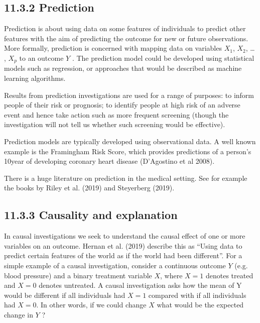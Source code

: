 \documentclass[letterpaper,10pt,english]{jupyterBook}
\begin{document}
\subsection{11.3.2 Prediction}
\label{\detokenize{11.d. Types of Investigation:prediction}}
\sphinxAtStartPar
Prediction is about using data on some features of individuals to predict other features with the aim of predicting the outcome for new or future observations. More formally, prediction is concerned with mapping data on variables \(X_{1}\), \(X_{2}\), … , \(X_{p}\) to an outcome \(Y\) . The prediction model could be developed using statistical models such as regression, or approaches that would be described as machine learning algorithms.

\sphinxAtStartPar
Results from prediction investigations are used for a range of purposes: to inform people of their risk or prognosis; to identify people at high risk of an adverse event and hence take action such as more frequent screening (though the investigation will not tell us whether such screening would be effective).

\sphinxAtStartPar
Prediction models are typically developed using observational data. A well known example is the Framingham Risk Score, which provides predictions of a person’s 10\sphinxhyphen{}year of developing coronary heart disease (D’Agostino et al 2008).

\sphinxAtStartPar
There is a huge literature on prediction in the medical setting. See for example the books by Riley et al. (2019) and Steyerberg (2019).


\subsection{11.3.3 Causality and explanation}
\label{\detokenize{11.d. Types of Investigation:causality-and-explanation}}
\sphinxAtStartPar
In causal investigations we seek to understand the causal effect of one or more variables on an outcome. Hernan et al. (2019) describe this as “Using data to predict certain features of the world as if the world had been different”. For a simple example of a causal investigation, consider a continuous outcome \(Y\) (e.g. blood pressure) and a binary treatment variable \(X\), where \(X = 1\) denotes treated and \(X = 0\) denotes untreated. A causal investigation asks how the mean of Y would be different if all individuals had \(X = 1\) compared with if all individuals had \(X = 0\). In other words, if we could change \(X\) what would be the expected change in \(Y\) ?
\end{document}
